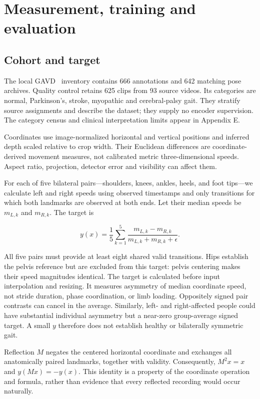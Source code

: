 \documentclass{article}
\begin{document}
\section{Measurement, training and evaluation}\label{measurement-training-and-evaluation}

\subsection{Cohort and target}\label{cohort-and-target}

The local GAVD~\citep{ref13} inventory contains 666 annotations and 642 matching pose archives. Quality control retains 625 clips from 93 source videos. Its categories are normal, Parkinson's, stroke, myopathic and cerebral-palsy gait. They stratify source assignments and describe the dataset; they supply no encoder supervision. The category census and clinical interpretation limits appear in Appendix E.

Coordinates use image-normalized horizontal and vertical positions and inferred depth scaled relative to crop width. Their Euclidean differences are coordinate-derived movement measures, not calibrated metric three-dimensional speeds. Aspect ratio, projection, detector error and visibility can affect them.

For each of five bilateral pairs---shoulders, knees, ankles, heels, and foot tips---we calculate left and right speeds using observed timestamps and only transitions for which both landmarks are observed at both ends. Let their median speeds be \(m_{L,k}\) and \(m_{R,k}\). The target is

\[
y(x)=\frac{1}{5}\sum_{k=1}^{5}
\frac{m_{L,k}-m_{R,k}}{m_{L,k}+m_{R,k}+\epsilon}.
\]

All five pairs must provide at least eight shared valid transitions. Hips establish the pelvis reference but are excluded from this target: pelvis centering makes their speed magnitudes identical. The target is calculated before input interpolation and resizing. It measures asymmetry of median coordinate speed, not stride duration, phase coordination, or limb loading. Oppositely signed pair contrasts can cancel in the average. Similarly, left- and right-affected people could have substantial individual asymmetry but a near-zero group-average signed target. A small \(y\) therefore does not establish healthy or bilaterally symmetric gait.

Reflection \(M\) negates the centered horizontal coordinate and exchanges all anatomically paired landmarks, together with validity. Consequently, \(M^2x=x\) and \(y(Mx)=-y(x)\). This identity is a property of the coordinate operation and formula, rather than evidence that every reflected recording would occur naturally.
\end{document}
